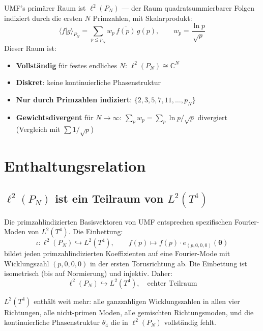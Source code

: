 UMF's primärer Raum ist $\ell^2(P_N)$ — der Raum quadratsummierbarer Folgen
indiziert durch die ersten $N$ Primzahlen, mit Skalarprodukt:
\begin{equation}
  \langle f | g \rangle_{P_N} = \sum_{p \leq p_N} w_p\, \overline{f(p)}\, g(p),
  \qquad w_p = \frac{\ln p}{\sqrt{p}}
  \tag{244.2}
\end{equation}
Dieser Raum ist:
\begin{itemize}
  \item \textbf{Vollständig} für festes endliches $N$: $\ell^2(P_N) \cong \mathbb{C}^N$
  \item \textbf{Diskret}: keine kontinuierliche Phasenstruktur
  \item \textbf{Nur durch Primzahlen indiziert}: $\{2, 3, 5, 7, 11, \ldots, p_N\}$
  \item \textbf{Gewichtsdivergent} für $N\to\infty$: $\sum_p w_p = \sum_p \ln p/\sqrt{p}$
    divergiert (Vergleich mit $\sum 1/\sqrt{p}$)
\end{itemize}

\section{Enthaltungsrelation}

\subsection{\texorpdfstring{$\ell^2(P_N)$}{ell2(P\_N)} ist ein Teilraum von \texorpdfstring{$L^2(T^4)$}{L2(T4)}}

Die primzahlindizierten Basisvektoren von UMF entsprechen spezifischen
Fourier-Moden von $L^2(T^4)$. Die Einbettung:
\begin{equation}
  \iota: \ell^2(P_N) \hookrightarrow L^2(T^4),
  \qquad f(p) \mapsto f(p)\cdot e_{(p,0,0,0)}(\symbf{\theta})
  \tag{244.3}
\end{equation}
bildet jeden primzahlindizierten Koeffizienten auf eine Fourier-Mode mit
Wicklungszahl $(p, 0, 0, 0)$ in der ersten Torusrichtung ab. Die Einbettung
ist isometrisch (bis auf Normierung) und injektiv. Daher:
\begin{equation}
  \boxed{\ell^2(P_N) \hookrightarrow L^2(T^4), \quad \text{echter Teilraum}}
  \tag{244.4}
\end{equation}

$L^2(T^4)$ enthält weit mehr: alle ganzzahligen Wicklungszahlen in allen vier
Richtungen, alle nicht-primen Moden, alle gemischten Richtungsmoden, und die
kontinuierliche Phasenstruktur $\theta_4$ die in $\ell^2(P_N)$ vollständig fehlt.

